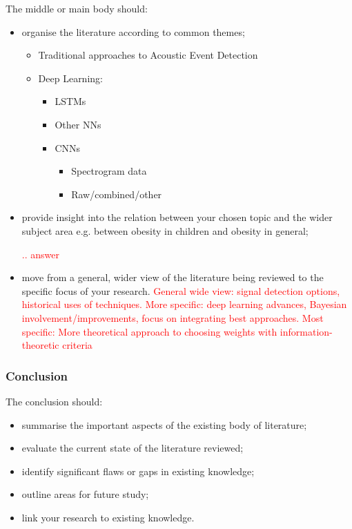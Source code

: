 \documentclass[12pt]{llncs}
\begin{document}
The middle or main body should:
\begin{itemize}
	\item organise the literature according to common themes;
\color{red}	
	\begin{itemize}

			\item Traditional approaches to Acoustic Event Detection
			\item Deep Learning:
			\begin{itemize}
				\item LSTMs
				\item Other NNs
				\item CNNs
				\begin{itemize}
					\item Spectrogram data
					\item Raw/combined/other

				\end{itemize}
			\end{itemize}	
	\end{itemize} 
\color{black}
	\item provide insight into the relation between your chosen topic and the wider subject area e.g. between obesity in children and obesity in general;
	
	\textcolor{red}{.. answer}
	\item move from a general, wider view of the literature being reviewed to the specific focus of your research.
	\textcolor{red}{General wide view: signal detection options, historical uses of techniques. More specific: deep learning advances, Bayesian involvement/improvements, focus on integrating best approaches. Most specific: More theoretical approach to choosing weights with information-theoretic criteria}
\end{itemize}
\color{black}
\subsubsection*{Conclusion}

The conclusion should:

\begin{itemize}
	\item summarise the important aspects of the existing body of literature;
	\item evaluate the current state of the literature reviewed;
	\item identify significant flaws or gaps in existing knowledge;
	\item outline areas for future study;
	\item link your research to existing knowledge.
\end{itemize}
\end{document}
